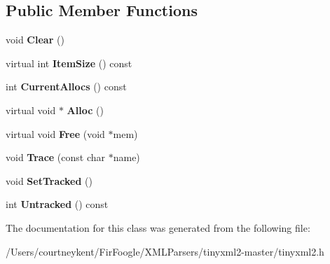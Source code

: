 \subsection*{Public Member Functions}
\begin{DoxyCompactItemize}
\item 
\hypertarget{classtinyxml2_1_1_mem_pool_t_a469d55e82be97d5ffeff82dd001a7029}{void {\bfseries Clear} ()}\label{classtinyxml2_1_1_mem_pool_t_a469d55e82be97d5ffeff82dd001a7029}

\item 
\hypertarget{classtinyxml2_1_1_mem_pool_t_a7ec8778fe99f6e332615a703be0b48bc}{virtual int {\bfseries Item\+Size} () const }\label{classtinyxml2_1_1_mem_pool_t_a7ec8778fe99f6e332615a703be0b48bc}

\item 
\hypertarget{classtinyxml2_1_1_mem_pool_t_a56be11b7db6a7ef00db17088a7769aab}{int {\bfseries Current\+Allocs} () const }\label{classtinyxml2_1_1_mem_pool_t_a56be11b7db6a7ef00db17088a7769aab}

\item 
\hypertarget{classtinyxml2_1_1_mem_pool_t_aa9d785a48ffe6ea1be679bab13464486}{virtual void $\ast$ {\bfseries Alloc} ()}\label{classtinyxml2_1_1_mem_pool_t_aa9d785a48ffe6ea1be679bab13464486}

\item 
\hypertarget{classtinyxml2_1_1_mem_pool_t_a4f1a0c434e9e3d7391e5c16ed4ee8c70}{virtual void {\bfseries Free} (void $\ast$mem)}\label{classtinyxml2_1_1_mem_pool_t_a4f1a0c434e9e3d7391e5c16ed4ee8c70}

\item 
\hypertarget{classtinyxml2_1_1_mem_pool_t_a0bc596f271e0f139822c534238b3f244}{void {\bfseries Trace} (const char $\ast$name)}\label{classtinyxml2_1_1_mem_pool_t_a0bc596f271e0f139822c534238b3f244}

\item 
\hypertarget{classtinyxml2_1_1_mem_pool_t_a7798932414916199a1bc0f9c3f368521}{void {\bfseries Set\+Tracked} ()}\label{classtinyxml2_1_1_mem_pool_t_a7798932414916199a1bc0f9c3f368521}

\item 
\hypertarget{classtinyxml2_1_1_mem_pool_t_a524b90d0edeac41964c06510757dce0f}{int {\bfseries Untracked} () const }\label{classtinyxml2_1_1_mem_pool_t_a524b90d0edeac41964c06510757dce0f}

\end{DoxyCompactItemize}


The documentation for this class was generated from the following file\+:\begin{DoxyCompactItemize}
\item 
/\+Users/courtneykent/\+Fir\+Foogle/\+X\+M\+L\+Parsers/tinyxml2-\/master/tinyxml2.\+h\end{DoxyCompactItemize}
